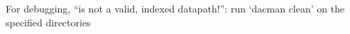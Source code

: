 For debugging,
``is not a valid, indexed datapath!'': run `dacman clean' on the specified directories
